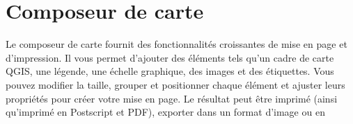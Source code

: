 \section{Composeur de carte}\label{label_printcomposer}


Le composeur de carte fournit des fonctionnalit\'es croissantes de mise en page et
d'impression. Il vous permet d'ajouter des \'el\'ements tels qu'un cadre de carte
QGIS, une l\'egende, une \'echelle graphique, des images et des \'etiquettes. Vous
pouvez modifier la taille, grouper et positionner chaque \'el\'ement et ajuster
leurs propri\'et\'es pour cr\'eer votre mise en page. Le r\'esultat peut \^etre imprim\'e
(ainsi qu'imprim\'e en Postscript et PDF), exporter dans un format d'image ou en
